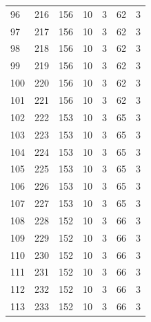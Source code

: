 \documentclass[a4paper,twoside,12pt]{book}
\begin{document}
\begin{appendices}
\begin{table}
\begin{tabular}{lrrrrrr}
		\bottomrule
	\end{tabular}		
\end{table}
\begin{table}
	\centering
	\begin{tabular}{lrrrrrr}
		\toprule
		96  &    216 &       156 &        10 &               3 &              62 &         3 \\
		97  &    217 &       156 &        10 &               3 &              62 &         3 \\
		98  &    218 &       156 &        10 &               3 &              62 &         3 \\
		99  &    219 &       156 &        10 &               3 &              62 &         3 \\
		100 &    220 &       156 &        10 &               3 &              62 &         3 \\
		101 &    221 &       156 &        10 &               3 &              62 &         3 \\
		102 &    222 &       153 &        10 &               3 &              65 &         3 \\
		103 &    223 &       153 &        10 &               3 &              65 &         3 \\
		104 &    224 &       153 &        10 &               3 &              65 &         3 \\
		105 &    225 &       153 &        10 &               3 &              65 &         3 \\
		106 &    226 &       153 &        10 &               3 &              65 &         3 \\
		107 &    227 &       153 &        10 &               3 &              65 &         3 \\
		108 &    228 &       152 &        10 &               3 &              66 &         3 \\
		109 &    229 &       152 &        10 &               3 &              66 &         3 \\
		110 &    230 &       152 &        10 &               3 &              66 &         3 \\
		111 &    231 &       152 &        10 &               3 &              66 &         3 \\
		112 &    232 &       152 &        10 &               3 &              66 &         3 \\
		113 &    233 &       152 &        10 &               3 &              66 &         3 \\

\end{tabular}
\end{table}
\end{appendices}
\end{document}
